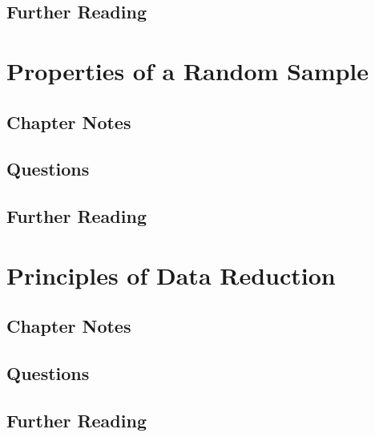 \documentclass[
]{book}
\begin{document}
\hypertarget{further-reading-3}{%
\section*{Further Reading}\label{further-reading-3}}

\hypertarget{sample_properties}{%
\chapter{Properties of a Random Sample}\label{sample_properties}}

\hypertarget{chapter-notes-4}{%
\section{Chapter Notes}\label{chapter-notes-4}}

\hypertarget{questions-4}{%
\section{Questions}\label{questions-4}}

\hypertarget{further-reading-4}{%
\section*{Further Reading}\label{further-reading-4}}

\hypertarget{data_reduction}{%
\chapter{Principles of Data Reduction}\label{data_reduction}}

\hypertarget{chapter-notes-5}{%
\section{Chapter Notes}\label{chapter-notes-5}}

\hypertarget{questions-5}{%
\section{Questions}\label{questions-5}}

\hypertarget{further-reading-5}{%
\section*{Further Reading}\label{further-reading-5}}
\end{document}

